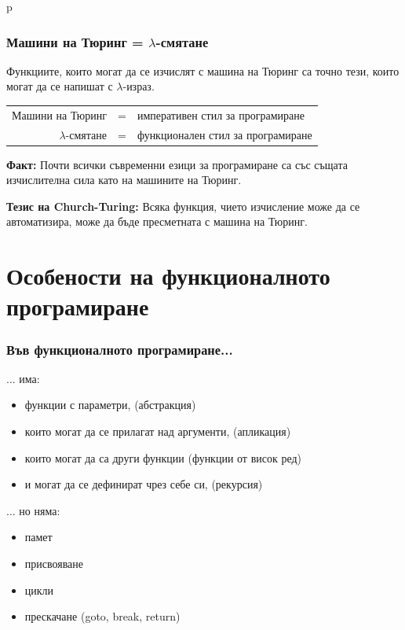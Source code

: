 p\documentclass{beamer}
\begin{document}
\begin{frame}
  \frametitle{Машини на Тюринг = $\lambda$-смятане}

  \begin{theorem}
  Функциите, които могат да се изчислят с машина на Тюринг са точно тези, които могат да се напишат с $\lambda$-израз.
  \end{theorem}

  \pause

  \begin{center}
    \begin{tabular}{|rcl|}
      \hline
      Машини на Тюринг & = & императивен стил за програмиране\\
      $\lambda$-смятане & = & функционален стил за програмиране\\
      \hline
    \end{tabular}
  \end{center}

  \pause

  \textbf{Факт: }Почти всички съвременни езици за програмиране са със същата изчислителна сила като на машините на Тюринг.
  \vspace{1em}

  \pause

  \textbf{Тезис на Church-Turing:} Всяка функция, чието изчисление може да се автоматизира, може да бъде пресметната с машина на Тюринг.

\end{frame}

\section*{Особености на функционалното програмиране}

\begin{frame}
  \frametitle{Във функционалното програмиране...}

  ... има:
  \begin{itemize}[<+->]
  \item функции с параметри, (абстракция)
  \item които могат да се прилагат над аргументи, (апликация)
  \item които могат да са други функции (функции от висок ред)
  \item и могат да се дефинират чрез себе си, (рекурсия)
  \end{itemize}
  \vspace{1 em}
  \pause
  ... но няма:
  \begin{itemize}[<+->]
  \item памет
  \item присвояване
  \item цикли
  \item прескачане (goto, break, return)
  \end{itemize}
\end{frame}
\end{document}
